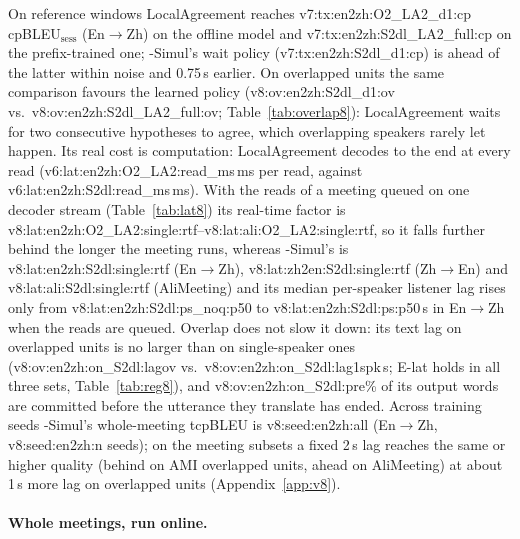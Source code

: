 

On reference windows LocalAgreement reaches \num{v7:tx:en2zh:O2_LA2_d1:cp} cpBLEU$_\text{sess}$ (En$\rightarrow$Zh) on
the offline model and \num{v7:tx:en2zh:S2dl_LA2_full:cp} on the prefix-trained one; \sys{}-Simul's wait policy
(\num{v7:tx:en2zh:S2dl_d1:cp}) is ahead of the latter within noise and 0.75\,s earlier. On overlapped units the same comparison favours the learned policy
(\num{v8:ov:en2zh:S2dl_d1:ov} vs.\ \num{v8:ov:en2zh:S2dl_LA2_full:ov}; Table~\ref{tab:overlap8}): LocalAgreement waits for
two consecutive hypotheses to agree, which overlapping speakers rarely let happen. Its real cost is computation:
LocalAgreement decodes to the end at every read (\num{v6:lat:en2zh:O2_LA2:read_ms}\,ms per read, against
\num{v6:lat:en2zh:S2dl:read_ms}\,ms). With the reads of a meeting queued on one decoder stream (Table~\ref{tab:lat8}) its
real-time factor is \num{v8:lat:en2zh:O2_LA2:single:rtf}--\num{v8:lat:ali:O2_LA2:single:rtf}, so it falls further behind
the longer the meeting runs, whereas \sys{}-Simul's is \num{v8:lat:en2zh:S2dl:single:rtf} (En$\rightarrow$Zh),
\num{v8:lat:zh2en:S2dl:single:rtf} (Zh$\rightarrow$En) and \num{v8:lat:ali:S2dl:single:rtf} (AliMeeting) and its median
per-speaker listener lag rises only from \num{v8:lat:en2zh:S2dl:ps_noq:p50} to \num{v8:lat:en2zh:S2dl:ps:p50}\,s in
En$\rightarrow$Zh when the reads are queued. Overlap does not slow it down: its text lag on overlapped units is no larger
than on single-speaker ones (\num{v8:ov:en2zh:on_S2dl:lagov} vs.\ \num{v8:ov:en2zh:on_S2dl:lag1spk}\,s; E-lat holds in
all three sets, Table~\ref{tab:reg8}), and \num{v8:ov:en2zh:on_S2dl:pre}\% of its output words are committed before the
utterance they translate has ended. Across training seeds \sys{}-Simul's whole-meeting tcpBLEU is \num{v8:seed:en2zh:all}
(En$\rightarrow$Zh, \num{v8:seed:en2zh:n} seeds); on the meeting subsets a fixed 2\,s lag reaches the same or higher quality
(behind on AMI overlapped units, ahead on AliMeeting) at about 1\,s more lag on overlapped units (Appendix~\ref{app:v8}).

\paragraph{Whole meetings, run online.}
\label{sec:res-online}

